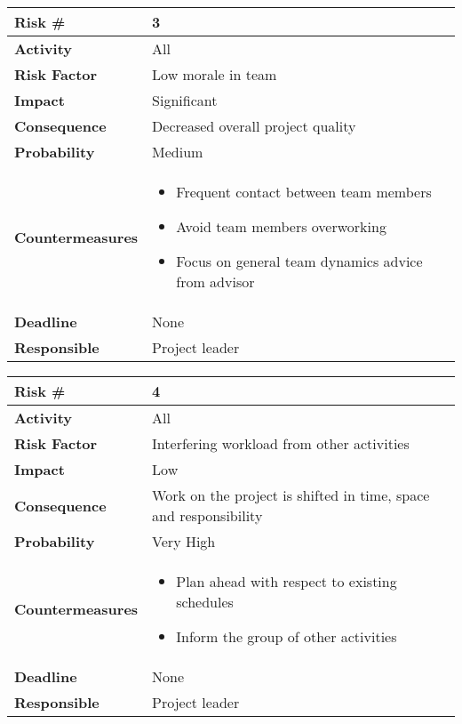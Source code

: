\begin{tabularx}{\textwidth}{ | l | X | }
\hline
\textbf{Risk \#} & 3 \\ \hline
\textbf{Activity} & All \\ \hline
\textbf{Risk Factor} & Low morale in team \\ \hline
\textbf{Impact} & Significant \\ \hline
\textbf{Consequence} & Decreased overall project quality \\ \hline
\textbf{Probability} & Medium  \\ \hline
\textbf{Countermeasures} & \begin{itemize}
  \item Frequent contact between team members
  \item Avoid team members overworking
  \item Focus on general team dynamics advice from advisor
\end{itemize}  \\ \hline
\textbf{Deadline} &  None \\ \hline
\textbf{Responsible} & Project leader \\ \hline
\end{tabularx}





\begin{tabularx}{\textwidth}{ | l | X | }
\hline
\textbf{Risk \#} & 4 \\ \hline
\textbf{Activity} & All \\ \hline
\textbf{Risk Factor} & Interfering workload from other activities \\ \hline
\textbf{Impact} & Low \\ \hline
\textbf{Consequence} & Work on the project is shifted in time, space and responsibility \\ \hline
\textbf{Probability} & Very High \\ \hline
\textbf{Countermeasures} & \begin{itemize}
  \item Plan ahead with respect to existing schedules
  \item Inform the group of other activities
\end{itemize}  \\ \hline
\textbf{Deadline} &  None \\ \hline
\textbf{Responsible} & Project leader \\ \hline
\end{tabularx}


